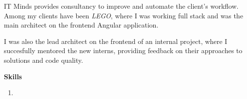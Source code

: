 
IT Minds provides consultancy to improve and automate the client's workflow. Among my clients have
been \emph{LEGO}, where I was working full stack and was the main architect on the frontend Angular
application.

\medskip

I was also the lead architect on the frontend of an internal project, where I succesfully mentored
the new interns, providing feedback on their approaches to solutions and code quality.

\medskip
{\color{accent} \textbf{Skills}}
\smallskip

\begin{enumerate}[leftmargin=2.5em] \small
\item[\indent\faWrench]    
    
\end{enumerate}
